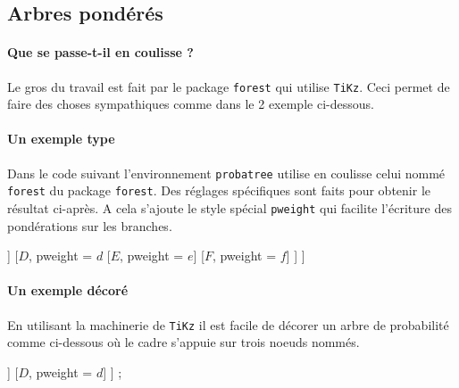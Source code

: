 \documentclass[12pt,a4paper]{article}
\begin{document}

\subsection{Arbres pondérés}

\paragraph{Que se passe-t-il en coulisse ?}

Le gros du travail est fait par le package \verb+forest+ qui utilise \verb+TiKz+. Ceci permet de faire des choses sympathiques comme dans le 2\ieme{} exemple ci-dessous.


\paragraph{Un exemple type}

Dans le code suivant l'environnement \verb+probatree+ utilise en coulisse celui nommé \verb+forest+ du package \verb+forest+. Des réglages spécifiques sont faits pour obtenir le résultat ci-après. A cela s'ajoute le style spécial \verb+pweight+ qui facilite l'écriture des pondérations sur les branches.

\begin{tcblisting}{}
\begin{probatree}
[
    [$A$, pweight = $a$
        [$B$, pweight = $b$]
        [$C$, pweight = $c$]
    ]
    [$D$, pweight = $d$
        [$E$, pweight = $e$]
        [$F$, pweight = $f$]
    ]
]
\end{probatree}

\end{tcblisting}


\paragraph{Un exemple décoré}

En utilisant la machinerie de \verb+TiKz+ il est facile de décorer un arbre de probabilité comme ci-dessous où le cadre s'appuie sur trois noeuds nommés.

\begin{tcblisting}{}
\begin{probatree}
[
    [$A$, pweight = $a$, name = left
        [$B$, pweight = $b$, name = topright]
        [$C$, pweight = $c$, name = bottomright]
    ]
    [$D$, pweight = $d$]
]
\node[draw = blue, thick, rounded corners, fit = (left)(topright)(bottomright)] {};
\end{probatree}

\end{tcblisting}
\end{document}
